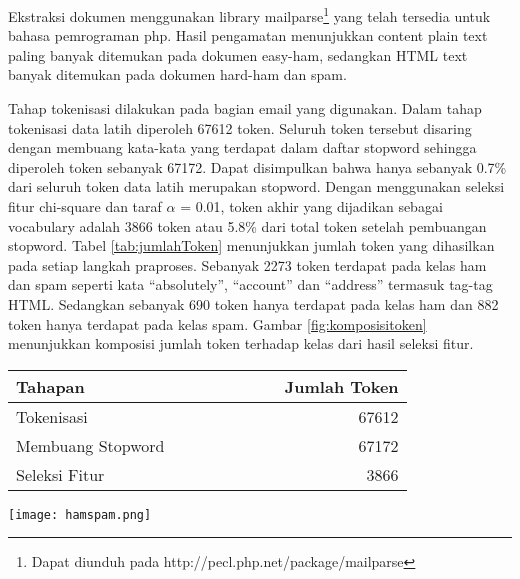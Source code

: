 Ekstraksi dokumen menggunakan library mailparse\footnote{Dapat diunduh pada http://pecl.php.net/package/mailparse} yang telah tersedia untuk bahasa pemrograman php. Hasil pengamatan menunjukkan content plain text paling banyak ditemukan pada dokumen easy-ham, sedangkan HTML text banyak ditemukan pada dokumen hard-ham dan spam.

Tahap tokenisasi dilakukan pada bagian email yang digunakan. Dalam tahap tokenisasi data latih diperoleh 67612 token. Seluruh token tersebut disaring dengan membuang kata-kata yang terdapat dalam daftar stopword sehingga diperoleh token sebanyak 67172. Dapat disimpulkan bahwa hanya sebanyak 0.7\% dari seluruh token data latih merupakan stopword. Dengan menggunakan seleksi fitur chi-square dan taraf $\alpha$ = 0.01, token akhir yang dijadikan sebagai vocabulary adalah 3866 token atau 5.8\% dari total token setelah pembuangan stopword. Tabel \ref{tab:jumlahToken} menunjukkan jumlah token yang dihasilkan pada setiap langkah praproses. Sebanyak 2273 token terdapat pada kelas ham dan spam seperti kata “absolutely”, “account” dan “address” termasuk tag-tag HTML. Sedangkan sebanyak 690 token hanya terdapat pada kelas ham dan 882 token hanya terdapat pada kelas spam. Gambar \ref{fig:komposisitoken} menunjukkan komposisi jumlah token terhadap kelas dari hasil seleksi fitur.
\begin{table*}[h!]
	\begin{center}
		\caption{Jumlah token yang dihasilkan}
		\label{tab:jumlahToken}
		\begin{tabular}{l r}
			\hline
			Tahapan~~~~~~~~~~&~~~~~~~~~~Jumlah Token \\
			\hline
			Tokenisasi &67612\\
			Membuang Stopword &67172\\
			Seleksi Fitur&3866\\
			\hline
		\end{tabular}
	\end{center}
\end{table*}
\begin{figure*}[h!]
	\centering
	\texttt{[image: hamspam.png]}
	\caption{Komposisi jumlah token hasil tahap seleksi fitur}
	\label{fig:komposisitoken}
\end{figure*}

